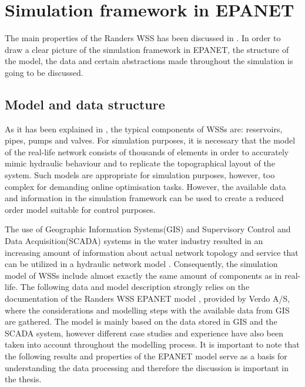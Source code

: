 \section{Simulation framework in EPANET}
\label{simulation_framework_in_EPANET}

The main properties of the Randers WSS has been discussed in . In order to draw a clear picture of the simulation framework in EPANET, the structure of the model, the data and certain abstractions made throughout the simulation is going to be discussed. 

\subsection{Model and data structure}
\label{model_data_and_structure}

As it has been explained in , the typical components of WSSs are: reservoirs, pipes, pumps and valves. For simulation purposes, it is necessary that the model of the real-life network consists of thousands of elements in order to accurately mimic hydraulic behaviour and to replicate the topographical layout of the system. Such models are appropriate for simulation purposes, however, too complex for demanding online optimisation tasks. However, the available data and information in the simulation framework can be used to create a reduced order model suitable for control purposes. 

The use of Geographic Information Systems(GIS) and Supervisory Control and Data Acquisition(SCADA) systems in the water industry resulted in an increasing amount of information about actual network topology and service that can be utilized in a hydraulic network model \cite{johnson2016geographic}. Consequently, the simulation model of WSSs include almost exactly the same amount of components as in real-life. The following data and model description strongly relies on the documentation of the Randers WSS EPANET model \cite{verdo_doc}, provided by Verdo A/S, where the considerations and modelling steps with the available data from GIS are gathered. The model is mainly based on the data stored in GIS and the SCADA system, however different case studies and experience have also been taken into account throughout the modelling process. It is important to note that the following results and properties of the EPANET model serve as a basis for understanding the data processing and therefore the discussion is important in the thesis.  

